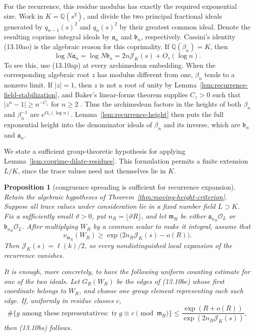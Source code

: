 \documentclass[11pt,reqno]{amsart}
\newtheorem{proposition}[theorem]{Proposition}
\theoremstyle{definition}
\theoremstyle{remark}
\newcommand{\Q}{\mathbb Q}
\newcommand{\Tr}{\operatorname{tr}}
\begin{document}
For the recurrence, this residue modulus has exactly the required
exponential size.  Work in \(K=\Q(s^2)\), and divide the two principal
fractional ideals generated by \(q_{n-1}(s)^2\) and \(q_n(s)^2\) by their
greatest common ideal.  Denote the resulting coprime integral ideals by
\(\mathfrak a_n\) and \(\mathfrak b_n\), respectively.  Cassini's identity
(13.10ao) is the algebraic reason for this coprimality.  If
\(\Q(\beta_n)=K\), then
\[
 \log N\mathfrak a_n
 =\log N\mathfrak b_n
 =2n\mathcal J_K(s)+O_s(\log n).
\tag{13.10br}
\]
To see this, use (13.10ap) at every archimedean embedding.  When the
corresponding algebraic root \(z\) has modulus different from one,
\(\beta_n\) tends to a nonzero limit.  If \(|z|=1\), then \(z\) is not a
root of unity by Lemma~\ref{lem:recurrence-field-stabilization}, and Baker's
linear-forms theorem supplies \(C_z>0\) such that
\(|z^n-1|\ge n^{-C_z}\) for \(n\ge2\)
\cite{BakerLinearForms}.  Thus the archimedean
factors in the heights of both \(\beta_n\) and \(\beta_n^{-1}\) are
\(e^{O_s(\log n)}\).  Lemma~\ref{lem:recurrence-height} then puts the full
exponential height into the denominator ideals of \(\beta_n\) and its
inverse, which are \(\mathfrak b_n\) and \(\mathfrak a_n\).

We state a sufficient group-theoretic hypothesis for applying
Lemma~\ref{lem:coprime-dilate-residues}.  This
formulation permits a finite extension \(L/K\), since the trace values need
not themselves lie in \(K\).

\begin{proposition}[congruence spreading is sufficient for recurrence expansion]
\label{prop:congruence-spreading-sufficient}
Retain the algebraic hypotheses of
Theorem~\ref{thm:moving-height-criterion}.  Suppose all trace values under
consideration lie in a fixed number field \(L\supset K\).  Fix a sufficiently
small \(\vartheta>0\), put \(n_R=\lfloor\vartheta R\rfloor\), and let
\(\mathfrak m_R\) be either
\(\mathfrak a_{n_R}\mathcal O_L\) or
\(\mathfrak b_{n_R}\mathcal O_L\).  After multiplying \(W_R\) by a common
scalar to make it integral, assume that
\[
 \nu_{\mathfrak m_R}(W_R)
 \ge
 \exp\bigl(2n_R\mathcal J_K(s)-o(R)\bigr).
\tag{13.10bs}
\]
Then \(\mathcal J_K(s)=\ell(k)/2\), so every nondistinguished local
expansion of the recurrence vanishes.

It is enough, more concretely, to have the following uniform counting
estimate for one of the two ideals.  Let \(G_R(W_R)\) be the edges of
(13.10be) whose first coordinate belongs to \(W_R\), and choose one group
element representing each such edge.  If, uniformly in residue classes
\(c\),
\[
 \#\{g\text{ among these representatives}:\Tr g\equiv c
          \pmod{\mathfrak m_R}\}
 \le
 \frac{\exp(R+o(R))}
      {\exp(2n_R\mathcal J_K(s))},
\tag{13.10bt}
\]
then (13.10bs) follows.
\end{proposition}
\end{document}
